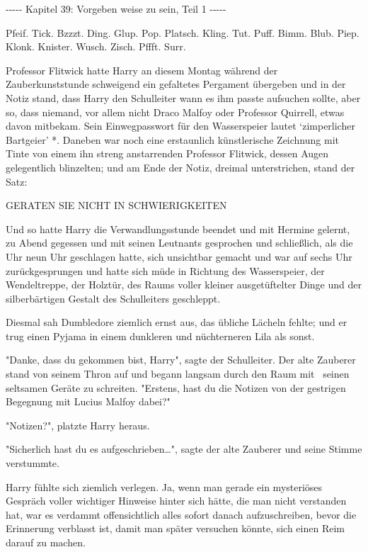 

\hypertarget{vorgeben-weise-zu-sein---teil-1}{%

-\/-\/-\/-\/- Kapitel 39: Vorgeben weise zu sein, Teil 1 -\/-\/-\/-\/-

Pfeif. Tick. Bzzzt. Ding. Glup. Pop. Platsch. Kling. Tut. Puff. Bimm. Blub. Piep. Klonk. Knister. Wusch. Zisch. Pffft. Surr.

Professor Flitwick hatte Harry an diesem Montag während der Zauberkunststunde schweigend ein gefaltetes Pergament übergeben und in der Notiz stand, dass Harry den Schulleiter wann es ihm passte aufsuchen sollte, aber so, dass niemand, vor allem nicht Draco Malfoy oder Professor Quirrell, etwas davon mitbekam. Sein Einwegpasswort für den Wasserspeier lautet `zimperlicher Bartgeier' *. Daneben war noch eine erstaunlich künstlerische Zeichnung mit Tinte von einem ihn streng anstarrenden Professor Flitwick, dessen Augen gelegentlich blinzelten; und am Ende der Notiz, dreimal unterstrichen, stand der Satz:

GERATEN SIE NICHT IN SCHWIERIGKEITEN

Und so hatte Harry die Verwandlungsstunde beendet und mit Hermine gelernt, zu Abend gegessen und mit seinen Leutnants gesprochen und schließlich, als die Uhr neun Uhr geschlagen hatte, sich unsichtbar gemacht und war auf sechs Uhr zurückgesprungen und hatte sich müde in Richtung des Wasserspeier, der Wendeltreppe, der Holztür, des Raums voller kleiner ausgetüftelter Dinge und der silberbärtigen Gestalt des Schulleiters geschleppt.

Diesmal sah Dumbledore ziemlich ernst aus, das übliche Lächeln fehlte; und er trug einen Pyjama in einem dunkleren und nüchterneren Lila als sonst.

"Danke, dass du gekommen bist, Harry", sagte der Schulleiter. Der alte Zauberer stand von seinem Thron auf und begann langsam durch den Raum mit ~seinen seltsamen Geräte zu schreiten. "Erstens, hast du die Notizen von der gestrigen Begegnung mit Lucius Malfoy dabei?"

"Notizen?", platzte Harry heraus.

"Sicherlich hast du es aufgeschrieben…", sagte der alte Zauberer und seine Stimme verstummte.

Harry fühlte sich ziemlich verlegen. Ja, wenn man gerade ein mysteriöses Gespräch voller wichtiger Hinweise hinter sich hätte, die man nicht verstanden hat, war es verdammt offensichtlich alles sofort danach aufzuschreiben, bevor die Erinnerung verblasst ist, damit man später versuchen könnte, sich einen Reim darauf zu machen.

}
